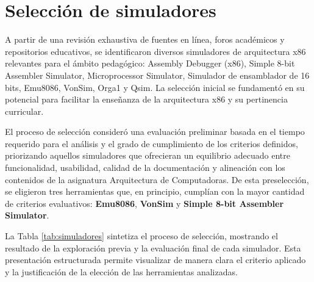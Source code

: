 \documentclass[12pt,oneside]{templates/unerthesis}
\begin{document}
\hypertarget{selecciuxf3n-de-simuladores}{%
\section{Selección de simuladores}\label{selecciuxf3n-de-simuladores}}

A partir de una revisión exhaustiva de fuentes en línea, foros académicos y repositorios educativos, se identificaron diversos simuladores de arquitectura x86 relevantes para el ámbito pedagógico: Assembly Debugger (x86), Simple 8-bit Assembler Simulator, Microprocessor Simulator, Simulador de ensamblador de 16 bits, Emu8086, VonSim, Orga1 y Qsim. La selección inicial se fundamentó en su potencial para facilitar la enseñanza de la arquitectura x86 y su pertinencia curricular.

El proceso de selección consideró una evaluación preliminar basada en el tiempo requerido para el análisis y el grado de cumplimiento de los criterios definidos, priorizando aquellos simuladores que ofrecieran un equilibrio adecuado entre funcionalidad, usabilidad, calidad de la documentación y alineación con los contenidos de la asignatura Arquitectura de Computadoras. De esta preselección, se eligieron tres herramientas que, en principio, cumplían con la mayor cantidad de criterios evaluativos: \textbf{Emu8086}, \textbf{VonSim} y \textbf{Simple 8-bit Assembler Simulator}.

La Tabla \ref{tab:simuladores} sintetiza el proceso de selección, mostrando el resultado de la exploración previa y la evaluación final de cada simulador. Esta presentación estructurada permite visualizar de manera clara el criterio aplicado y la justificación de la elección de las herramientas analizadas.
\end{document}
